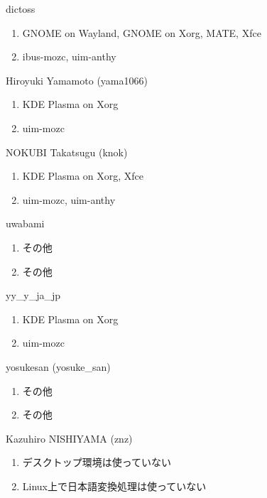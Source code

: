 \begin{prework}{ dictoss }
  \begin{enumerate}
  \item GNOME on Wayland, GNOME on Xorg, MATE, Xfce
  \item ibus-mozc, uim-anthy
  \end{enumerate}
\end{prework}

\begin{prework}{ Hiroyuki Yamamoto (yama1066) }
  \begin{enumerate}
  \item KDE Plasma on Xorg
  \item uim-mozc
  \end{enumerate}
\end{prework}

\begin{prework}{ NOKUBI Takatsugu (knok) }
  \begin{enumerate}
  \item KDE Plasma on Xorg, Xfce
  \item uim-mozc, uim-anthy
  \end{enumerate}
\end{prework}

\begin{prework}{ uwabami }
  \begin{enumerate}
  \item その他
  \item その他
  \end{enumerate}
\end{prework}

\begin{prework}{ yy\_y\_ja\_jp }
  \begin{enumerate}
  \item KDE Plasma on Xorg
  \item uim-mozc
  \end{enumerate}
\end{prework}

\begin{prework}{ yosukesan (yosuke\_san) }
  \begin{enumerate}
  \item その他
  \item その他
  \end{enumerate}
\end{prework}

\begin{prework}{ Kazuhiro NISHIYAMA (znz) }
  \begin{enumerate}
  \item デスクトップ環境は使っていない
  \item Linux上で日本語変換処理は使っていない
  \end{enumerate}
\end{prework}
